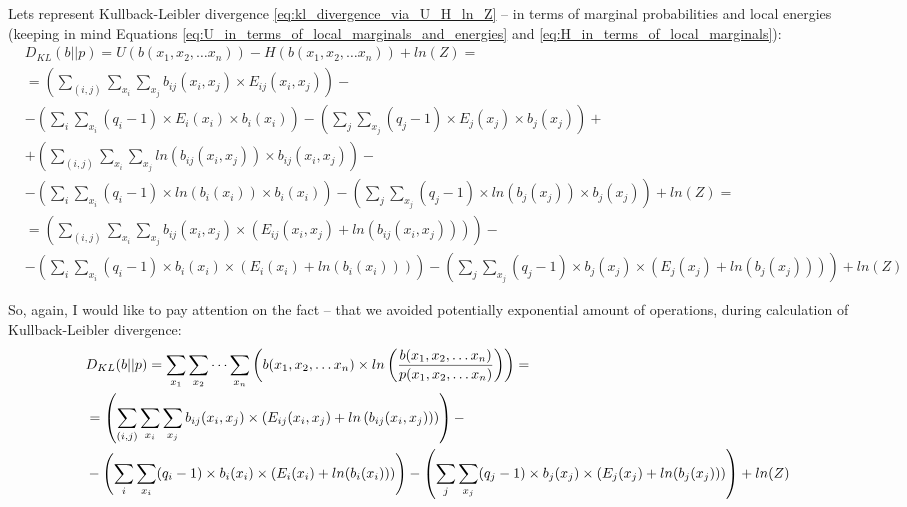 \documentclass[fleqn,leqno]{article}
\begin{document}
Lets represent Kullback-Leibler divergence \eqref{eq:kl_divergence_via_U_H_ln_Z} -- in terms of marginal probabilities and local energies (keeping in mind Equations \eqref{eq:U_in_terms_of_local_marginals_and_energies} and \eqref{eq:H_in_terms_of_local_marginals}):
\begin{equation}
\begin{split}
   & D_{KL}(b||p) = U(b(x_1,x_2,\dots x_n)) - H(b(x_1,x_2,\dots x_n)) + ln(Z) = \\
   & = \left( \sum_{(i, j)} \sum_{x_i} \sum_{x_j} b_{ij}(x_i, x_j) \times E_{ij}(x_i, x_j) \right) - \\
   & -\left( \sum_{i} \sum_{x_i} (q_i - 1) \times E_i(x_i) \times b_i(x_i) \right) -\left( \sum_{j} \sum_{x_j} (q_j - 1) \times E_j(x_j) \times b_j(x_j) \right) + \\
   & +\left( \sum_{(i, j)} \sum_{x_i} \sum_{x_j} ln \left( b_{ij}(x_i, x_j) \right) \times b_{ij}(x_i, x_j) \right) - \\
   & -\left( \sum_i \sum_{x_i} (q_i - 1) \times ln(b_i(x_i)) \times b_i(x_i) \right) - \left( \sum_j \sum_{x_j} (q_j - 1) \times ln(b_j(x_j)) \times b_j(x_j) \right) + ln(Z) = \\
   & = \left( \sum_{(i, j)} \sum_{x_i} \sum_{x_j} b_{ij}(x_i, x_j) \times \left( E_{ij}(x_i, x_j) + ln \left( b_{ij}(x_i, x_j) \right) \right) \right) - \\
   & -\left( \sum_{i} \sum_{x_i} (q_i - 1) \times b_i(x_i) \times \left( E_i(x_i) + ln(b_i(x_i)) \right) \right) -\left( \sum_{j} \sum_{x_j} (q_j - 1) \times b_j(x_j) \times \left( E_j(x_j) + ln(b_j(x_j)) \right) \right) + ln(Z)
\end{split}
\end{equation}

So, again, I would like to pay attention on the fact -- that we avoided potentially exponential amount of operations, during calculation of Kullback-Leibler divergence:
\begin{equation} \label{eq:D_KL}
\begin{split}
   & D_{KL}(b||p) = \sum_{x_1} \sum_{x_2} \cdots \sum_{x_n} \left( b(x_1, x_2, \dots x_n) \times ln \left( {b(x_1, x_2, \dots x_n) \over p(x_1, x_2, \dots x_n)} \right) \right) = \\
   & = \left( \sum_{(i, j)} \sum_{x_i} \sum_{x_j} b_{ij}(x_i, x_j) \times \left( E_{ij}(x_i, x_j) + ln \left( b_{ij}(x_i, x_j) \right) \right) \right) - \\
   & -\left( \sum_{i} \sum_{x_i} (q_i - 1) \times b_i(x_i) \times \left( E_i(x_i) + ln(b_i(x_i)) \right) \right) -\left( \sum_{j} \sum_{x_j} (q_j - 1) \times b_j(x_j) \times \left( E_j(x_j) + ln(b_j(x_j)) \right) \right) + ln(Z)
\end{split}
\end{equation}
\end{document}
